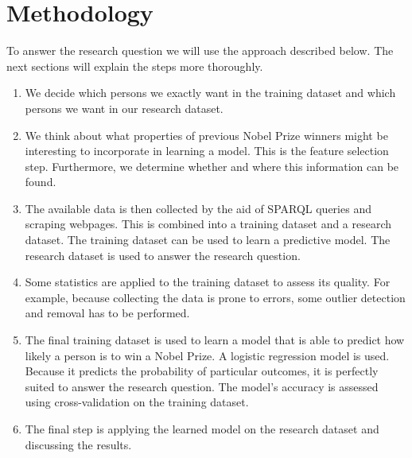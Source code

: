 \section{Methodology}
\label{sec:methodology}
To answer the research question we will use the approach described below. The next sections will explain the steps more thoroughly.
\begin{enumerate}
\item We decide which persons we exactly want in the training dataset and which persons we want in our research dataset.
\item We think about what properties of previous Nobel Prize winners might be interesting to incorporate in learning a model. This is the feature selection step. Furthermore, we determine whether and where this information can be found.
\item The available data is then collected by the aid of SPARQL queries and scraping webpages. This is combined into a training dataset and a research dataset. The training dataset can be used to learn a predictive model. The research dataset is used to answer the research question.
\item Some statistics are applied to the training dataset to assess its quality. For example, because collecting the data is prone to errors, some outlier detection and removal has to be performed.
\item The final training dataset is used to learn a model that is able to predict how likely a person is to win a Nobel Prize. A logistic regression model is used. Because it predicts the probability of particular outcomes, it is perfectly suited to answer the research question. The model's accuracy is assessed using cross-validation on the training dataset.
\item The final step is applying the learned model on the research dataset and discussing the results. 
\end{enumerate}
